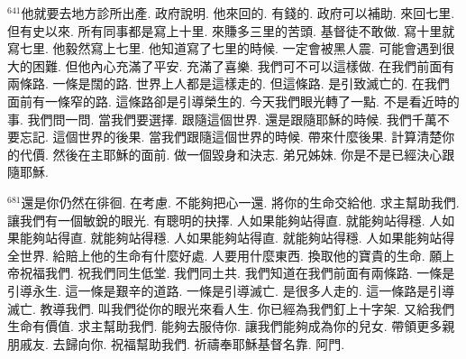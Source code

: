 \documentclass{book}
\begin{document}
$^{641}$他就要去地方診所出產.
政府說明.
他來回的.
有錢的.
政府可以補助.
來回七里.
但有史以來.
所有同事都是寫上十里.
來賺多三里的苦頭.
基督徒不敢做.
寫十里就寫七里.
他毅然寫上七里.
他知道寫了七里的時候.
一定會被黑人震.
可能會遇到很大的困難.
但他內心充滿了平安.
充滿了喜樂.
我們可不可以這樣做.
在我們前面有兩條路.
一條是闊的路.
世界上人都是這樣走的.
但這條路.
是引致滅亡的.
在我們面前有一條窄的路.
這條路卻是引導榮生的.
今天我們眼光轉了一點.
不是看近時的事.
我們問一問.
當我們要選擇.
跟隨這個世界.
還是跟隨耶穌的時候.
我們千萬不要忘記.
這個世界的後果.
當我們跟隨這個世界的時候.
帶來什麼後果.
計算清楚你的代價.
然後在主耶穌的面前.
做一個毀身和決志.
弟兄姊妹.
你是不是已經決心跟隨耶穌.

$^{681}$還是你仍然在徘徊.
在考慮.
不能夠把心一還.
將你的生命交給他.
求主幫助我們.
讓我們有一個敏銳的眼光.
有聰明的抉擇.
人如果能夠站得直.
就能夠站得穩.
人如果能夠站得直.
就能夠站得穩.
人如果能夠站得直.
就能夠站得穩.
人如果能夠站得全世界.
給賠上他的生命有什麼好處.
人要用什麼東西.
換取他的寶貴的生命.
願上帝祝福我們.
祝我們同生低堂.
我們同土共.
我們知道在我們前面有兩條路.
一條是引導永生.
這一條是艱辛的道路.
一條是引導滅亡.
是很多人走的.
這一條路是引導滅亡.
教導我們.
叫我們從你的眼光來看人生.
你已經為我們釘上十字架.
又給我們生命有價值.
求主幫助我們.
能夠去服侍你.
讓我們能夠成為你的兒女.
帶領更多親朋戚友.
去歸向你.
祝福幫助我們.
祈禱奉耶穌基督名靠.
阿門.
\newpage
\end{document}
